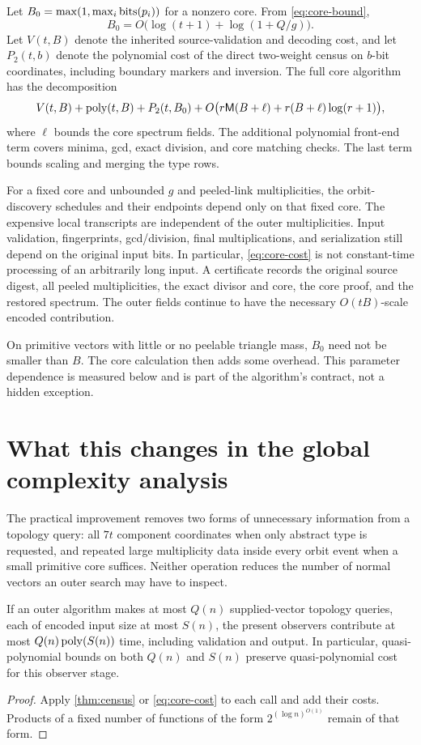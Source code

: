 Let $B_0=\max(1,\max_i\operatorname{bits}(p_i))$ for a nonzero core. From
\eqref{eq:core-bound},
\[
 B_0=O\bigl(\log(t+1)+\log(1+Q/g)\bigr).
\]
Let $V(t,B)$ denote the inherited source-validation and decoding cost,
and let $P_2(t,b)$ denote the polynomial cost of the direct two-weight
census on $b$-bit coordinates, including boundary markers and inversion.
The full core algorithm has the decomposition
\begin{equation}
 V(t,B)+\operatorname{poly}(t,B)+P_2(t,B_0)
 +O\bigl(r\mathsf M(B+\ell)+r(B+\ell)\log(r+1)\bigr),
 \label{eq:core-cost}
\end{equation}
where $\ell$ bounds the core spectrum fields. The additional polynomial
front-end term covers minima, gcd, exact division, and core matching
checks. The last term bounds scaling and merging the type rows.

For a fixed core and unbounded $g$ and peeled-link multiplicities, the
orbit-discovery schedules and their endpoints depend only on that fixed
core. The expensive local transcripts are independent of the outer
multiplicities. Input validation, fingerprints, gcd/division, final
multiplications, and serialization still depend on the original input
bits. In particular, \eqref{eq:core-cost} is not constant-time processing
of an arbitrarily long input. A certificate records the original source
digest, all peeled multiplicities, the exact divisor and core, the core
proof, and the restored spectrum. The outer fields continue to have the
necessary $O(tB)$-scale encoded contribution.

On primitive vectors with little or no peelable triangle mass, $B_0$ need
not be smaller than $B$. The core calculation then adds some overhead.
This parameter dependence is measured below and is part of the algorithm's
contract, not a hidden exception.

\section{What this changes in the global complexity analysis}
\label{sec:global}

The practical improvement removes two forms of unnecessary information
from a topology query: all $7t$ component coordinates when only abstract
type is requested, and repeated large multiplicity data inside every orbit
event when a small primitive core suffices. Neither operation reduces the
number of normal vectors an outer search may have to inspect.

\begin{proposition}
If an outer algorithm makes at most $Q(n)$ supplied-vector topology
queries, each of encoded input size at most $S(n)$, the present observers
contribute at most $Q(n)\operatorname{poly}(S(n))$ time, including validation and output.
In particular, quasi-polynomial bounds on both $Q(n)$ and $S(n)$ preserve
quasi-polynomial cost for this observer stage.
\end{proposition}
\begin{proof}
Apply \cref{thm:census} or \eqref{eq:core-cost} to each call and add their
costs. Products of a fixed number of functions of the form
$2^{(\log n)^{O(1)}}$ remain of that form.
\end{proof}

